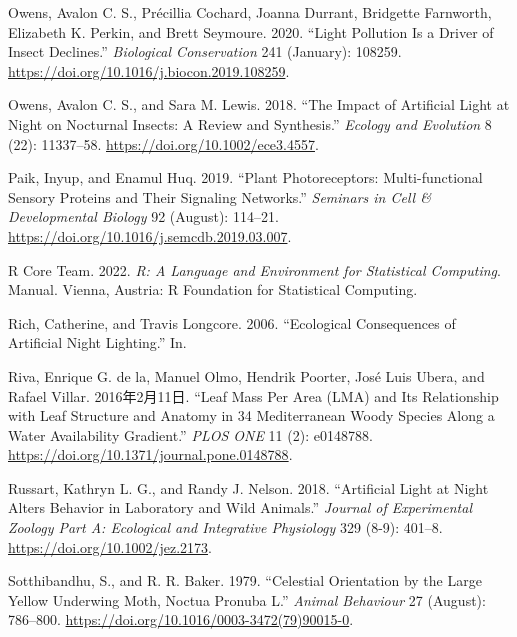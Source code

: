 \documentclass[
]{article}
\newlength{\cslhangindent}
\newlength{\cslentryspacingunit} %
\newenvironment{CSLReferences}[2] %
 {%
  \setlength{\parindent}{0pt}
  \ifodd #1
  \let\oldpar\par
  \def\par{\hangindent=\cslhangindent\oldpar}
  \fi
  \setlength{\parskip}{#2\cslentryspacingunit}
 }%
 {}
\begin{document}
\begin{CSLReferences}{1}{0}
\leavevmode{}%
Owens, Avalon C. S., Précillia Cochard, Joanna Durrant, Bridgette
Farnworth, Elizabeth K. Perkin, and Brett Seymoure. 2020. {``Light
Pollution Is a Driver of Insect Declines.''} \emph{Biological
Conservation} 241 (January): 108259.
\url{https://doi.org/10.1016/j.biocon.2019.108259}.

\leavevmode{}%
Owens, Avalon C. S., and Sara M. Lewis. 2018. {``The Impact of
Artificial Light at Night on Nocturnal Insects: {A} Review and
Synthesis.''} \emph{Ecology and Evolution} 8 (22): 11337--58.
\url{https://doi.org/10.1002/ece3.4557}.

\leavevmode{}%
Paik, Inyup, and Enamul Huq. 2019. {``Plant Photoreceptors:
{Multi-functional} Sensory Proteins and Their Signaling Networks.''}
\emph{Seminars in Cell \& Developmental Biology} 92 (August): 114--21.
\url{https://doi.org/10.1016/j.semcdb.2019.03.007}.

\leavevmode{}%
R Core Team. 2022. \emph{R: {A} Language and Environment for Statistical
Computing}. Manual. {Vienna, Austria}: {R Foundation for Statistical
Computing}.

\leavevmode{}%
Rich, Catherine, and Travis Longcore. 2006. {``Ecological Consequences
of Artificial Night Lighting.''} In.

\leavevmode{}%
Riva, Enrique G. de la, Manuel Olmo, Hendrik Poorter, José Luis Ubera,
and Rafael Villar. 2016年2月11日. {``Leaf {Mass} Per {Area} ({LMA}) and
{Its Relationship} with {Leaf Structure} and {Anatomy} in 34
{Mediterranean Woody Species} Along a {Water Availability Gradient}.''}
\emph{PLOS ONE} 11 (2): e0148788.
\url{https://doi.org/10.1371/journal.pone.0148788}.

\leavevmode{}%
Russart, Kathryn L. G., and Randy J. Nelson. 2018. {``Artificial Light
at Night Alters Behavior in Laboratory and Wild Animals.''}
\emph{Journal of Experimental Zoology Part A: Ecological and Integrative
Physiology} 329 (8-9): 401--8. \url{https://doi.org/10.1002/jez.2173}.

\leavevmode{}%
Sotthibandhu, S., and R. R. Baker. 1979. {``Celestial Orientation by the
Large Yellow Underwing Moth, {Noctua} Pronuba {L}.''} \emph{Animal
Behaviour} 27 (August): 786--800.
\url{https://doi.org/10.1016/0003-3472(79)90015-0}.


\end{CSLReferences}
\end{document}
